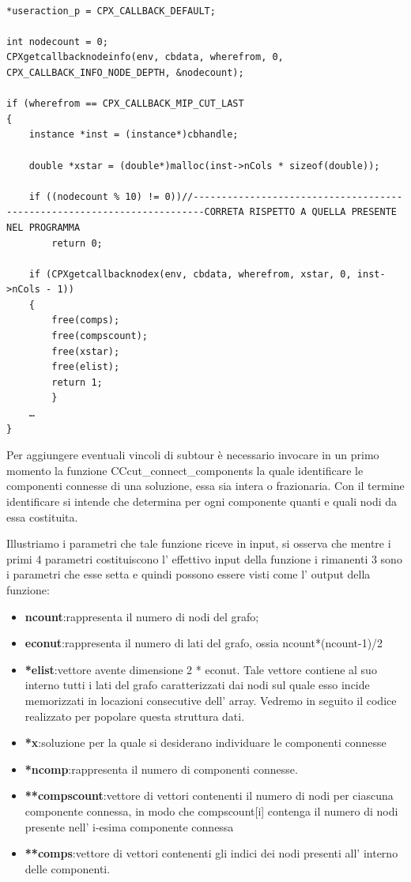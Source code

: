 \documentclass[11pt]{article}
\begin{document}
\begin{lstlisting}

*useraction_p = CPX_CALLBACK_DEFAULT;
	
int nodecount = 0;
CPXgetcallbacknodeinfo(env, cbdata, wherefrom, 0, CPX_CALLBACK_INFO_NODE_DEPTH, &nodecount);
	
if (wherefrom == CPX_CALLBACK_MIP_CUT_LAST 
{
	instance *inst = (instance*)cbhandle;
		
	double *xstar = (double*)malloc(inst->nCols * sizeof(double));

 	if ((nodecount % 10) != 0))//------------------------------------------------------------------------CORRETA RISPETTO A QUELLA PRESENTE NEL PROGRAMMA
		return 0;

	if (CPXgetcallbacknodex(env, cbdata, wherefrom, xstar, 0, inst->nCols - 1))
	{
		free(comps);
		free(compscount);
		free(xstar);
		free(elist);
		return 1; 
		}
	…
}

\end{lstlisting}


Per aggiungere eventuali vincoli di subtour è necessario invocare in un primo momento la funzione CCcut_connect_components la quale identificare le componenti connesse di una soluzione, essa sia intera o frazionaria. Con il termine identificare si intende che determina per ogni componente quanti e quali nodi da essa costituita.

Illustriamo i parametri che tale funzione riceve in input, si osserva che mentre i primi 4 parametri costituiscono l' effettivo input della funzione i rimanenti 3 sono i parametri che esse setta e quindi possono essere visti come l' output della funzione:

\begin{itemize}
	\item \textbf{ncount}:rappresenta il numero di nodi del grafo;
	\item \textbf{econut}:rappresenta il numero di lati del grafo, ossia ncount*(ncount-1)/2
	\item \textbf{*elist}:vettore avente dimensione 2 * econut. Tale vettore contiene al suo interno tutti i lati del grafo caratterizzati dai nodi sul quale esso incide memorizzati in locazioni consecutive dell’ array. Vedremo in seguito il codice realizzato per popolare questa struttura dati.
	\item \textbf{*x}:soluzione per la quale si desiderano individuare le componenti connesse
	\item \textbf{*ncomp}:rappresenta il numero di componenti connesse.
	\item \textbf{**compscount}:vettore di vettori contenenti il numero di nodi per ciascuna componente connessa, in modo che compscount[i] contenga il numero di nodi presente nell’ i-esima componente connessa
	\item \textbf{**comps}:vettore di vettori contenenti gli indici dei nodi presenti all' interno delle componenti.
\end{itemize}
\end{document}
